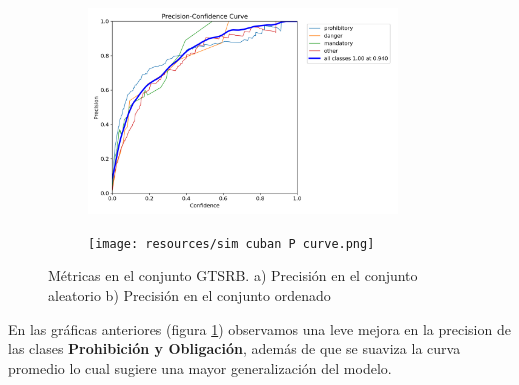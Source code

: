 \documentclass{article}
\begin{document}
\begin{figure}[h]
\begin{subfigure}[b]{0.5\textwidth}
\centering
\includegraphics[width=0.9\textwidth]{resources/random cuban P curve.png}
\caption{}
\end{subfigure}
\begin{subfigure}[b]{0.5\textwidth}
\centering
\texttt{[image: resources/sim cuban P  curve.png]}
\caption{}
\end{subfigure}
\caption{Métricas en el conjunto GTSRB. a) Precisión en el conjunto aleatorio b) Precisión en el conjunto ordenado}
\label{fig:precision random vs precision sim}
\end{figure}

En las gráficas anteriores (figura \ref{fig:precision random vs precision sim}) observamos una leve mejora en la precision de las clases \textbf{Prohibición y Obligación}, además de que se suaviza la curva promedio lo cual sugiere una mayor generalización del modelo.
\end{document}
